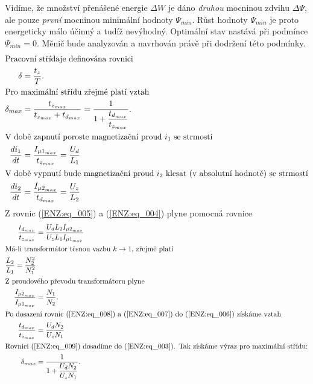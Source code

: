   Vidíme, že množství přenášené energie \(\Delta W\) je dáno \emph{druhou} mocninou zdvihu 
  \(\Delta\Psi\), ale pouze \emph{první} mocninou minimální hodnoty \(\Psi_{min}\). Růst hodnoty 
  \(\Psi_{min}\) je proto energeticky málo účinný a tudíž nevýhodný. Optimální stav nastává při 
  podmínce \(\Psi_{min} = 0\). Měnič bude analyzován a navrhován právě při dodržení této podmínky.
  \begin{align}
    \shortintertext{Pracovní střídaje definována rovnici}
    \delta       &= \frac{t_z}{T}. \label{ENZ:eq_002} \\
    \shortintertext{Pro maximální střídu zřejmé platí vztah}
    \delta_{max} &= \frac{t_{z_{max}}}{t_{z_{max}}+t_{d_{max}}}
                  = \dfrac{1}{1+\dfrac{t_{d_{max}}}{t_{z_{max}}}}. \label{ENZ:eq_003} \\
    \shortintertext{V době zapnutí poroste magnetizaění proud \(i_1\) se strmostí}
    \dfrac{d i_1}{d t} &= \frac{I_{{\mu1}_{max}}}{t_{z_{max}}} 
                  = \frac{U_d}{L_1}  \label{ENZ:eq_004} \\
    \shortintertext{V době vypnutí bude magnetizaění proud \(i_2\) klesat (v absolutní hodnotě) 
                    se strmostí}
    \dfrac{d i_2}{d t} &= \frac{I_{{\mu2}_{max}}}{t_{d_{max}}} 
                  = \frac{U_z}{L_2}  \label{ENZ:eq_005}
  \end{align}    
  Z rovnic (\ref{ENZ:eq_005}) a (\ref{ENZ:eq_004}) plyne pomocná rovnice
  \begin{align}
    \frac{t_{d_{max}}}{t_{z_{max}}} 
      &= \frac{U_d L_2 I_{{\mu2}_{max}}}{U_z L_1 I_{{\mu1}_{max}}} \label{ENZ:eq_006} \\
    \shortintertext{Má-li transformátor těsnou vazbu \(k \rightarrow 1\), zřejmě platí}  
    \frac{L_2}{L_1} = \frac{N_2^2}{N_1^2} \label{ENZ:eq_007} \\
    \shortintertext{Z proudového převodu transformátoru plyne}
    \frac{I_{{\mu2}_{max}}}{I_{{\mu1}_{max}}}
      &= \frac{N_1}{N_2}. \label{ENZ:eq_008} \\
    \shortintertext{Po dosazení rovnic (\ref{ENZ:eq_008}) a (\ref{ENZ:eq_007}) do
                   (\ref{ENZ:eq_006}) získáme vztah}
    \frac{t_{d_{max}}}{t_{z_{max}}} 
      &= \frac{U_d N_2}{U_z N_1}  \label{ENZ:eq_009} \\
    \shortintertext{Rovnici (\ref{ENZ:eq_009}) dosadíme do (\ref{ENZ:eq_003}). Tak získáme výraz 
                    pro maximální střídu:}
    \delta_{max} 
      &= \dfrac{1}{1+\dfrac{U_d N_2}{U_z N_1}}. \label{ENZ:eq_010} 
  \end{align}
